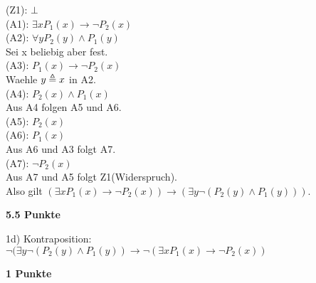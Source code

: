 \documentclass[twoside,10pt,fleqn,headinclude=false]{scrartcl}
\begin{document}
\begin{compactenum}
	(Z1): $\bot$\\
	(A1): $\exists x P_1(x) \rightarrow \lnot P_2(x) $\\
	(A2): $\forall y  P_2(y) \land P_1(y) $\\
	Sei x beliebig aber fest.\\
	(A3): $P_1(x) \rightarrow \lnot P_2(x) $\\
	Waehle $y \triangleq x$ in A2.\\
	(A4): $P_2(x) \land P_1(x) $\\
	Aus A4 folgen A5 und A6.\\
	(A5): $P_2(x)$\\
	(A6): $P_1(x)$\\
	Aus A6 und A3 folgt A7.\\
	(A7): $\lnot P_2(x)$\\
	Aus A7 und A5 folgt Z1(Widerspruch).\\
	Also gilt $(\exists x P_1(x) \rightarrow \lnot P_2(x) ) \rightarrow ( \exists y \lnot ( P_2(y) \land P_1(y) ))$.
	\item[] \hfill \textbf{5.5 Punkte}
	\item[1d)] %
	Kontraposition:\\
	$ \lnot ( \exists y \lnot ( P_2(y) \land P_1(y) ) \rightarrow \lnot (\exists x P_1(x) \rightarrow \lnot P_2(x) )  $
	\item[] \hfill \textbf{1 Punkte}
\end{compactenum}

\newpage
\end{document}

